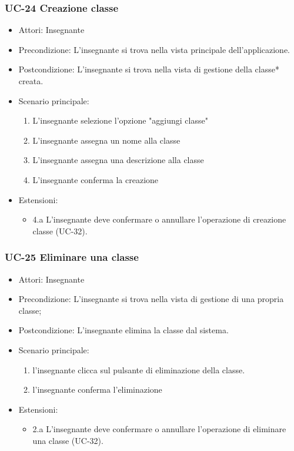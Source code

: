 \subsubsection{UC-24 Creazione classe}

\begin{itemize}
	\item Attori: Insegnante
	\item Precondizione: L'insegnante si trova nella vista principale dell'applicazione.
	\item Postcondizione: L'insegnante si trova nella vista di gestione della classe* creata.
	\item Scenario principale:
	\begin{enumerate}
		\item L'insegnante selezione l'opzione "aggiungi classe"
		\item L'insegnante assegna un nome alla classe
		\item L'insegnante assegna una descrizione alla classe
		\item L'insegnante conferma la creazione
	\end{enumerate}
\item Estensioni:
\begin{itemize}
\item 4.a L'insegnante deve confermare o annullare l'operazione di creazione classe (UC-32).
\end{itemize}

\end{itemize}

\subsubsection{UC-25 Eliminare una classe}
\begin{itemize}
	\item Attori: Insegnante
	\item Precondizione: L'insegnante si trova nella vista di gestione di una propria classe;
	\item Postcondizione: L'insegnante elimina la classe dal sistema.
	\item Scenario principale:
	\begin{enumerate}
		\item l'insegnante clicca sul pulsante di eliminazione della classe.
		\item l'insegnante conferma l'eliminazione
	\end{enumerate}
\item Estensioni:
\begin{itemize}
	\item 2.a L'insegnante deve confermare o annullare l'operazione di eliminare una classe (UC-32).
\end{itemize}
\end{itemize}

